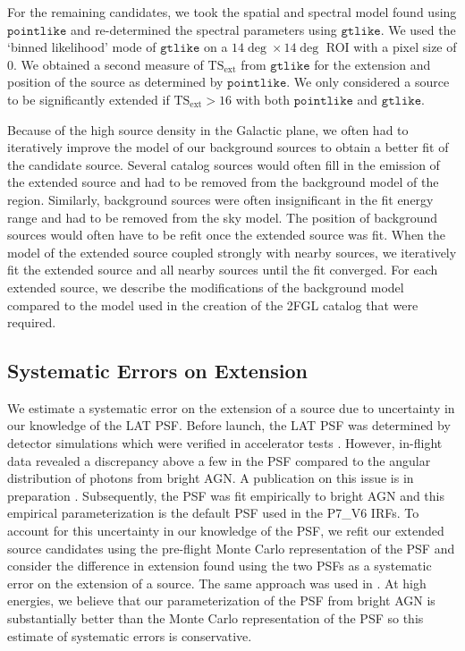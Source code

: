 \documentclass[12pt,preprint]{aastex}
\newcommand{\gev}{\text{GeV}\xspace}
\newcommand{\tsext}{{\ensuremath{\text{TS}_{\text{ext}}}}\xspace}
\newcommand{\gtlike}{\ensuremath{\mathtt{gtlike}}\xspace}
\newcommand{\pointlike}{\ensuremath{\mathtt{pointlike}}\xspace}
\begin{document}
For the remaining candidates, we took the spatial and spectral model found
using \pointlike and re-determined the spectral parameters using \gtlike.
We used the `binned likelihood' mode of \gtlike on a $14\deg\times14\deg$
ROI with a pixel size of 0.  We obtained a second measure of \tsext
from \gtlike for the extension and position of the source as determined
by \pointlike.  We only considered a source to be significantly extended
if $\tsext>16$ with both \pointlike and \gtlike.

Because of the high source density in the Galactic plane, we often had
to iteratively improve the model of our background sources to obtain a
better fit of the candidate source.  Several catalog sources would often
fill in the emission of the extended source and had to be removed from
the background model of the region.  Similarly, background sources were
often insignificant in the fit energy range and had to be removed from
the sky model.  The position of background sources would often have
to be refit once the extended source was fit.  When the model of the
extended source coupled strongly with nearby sources, we iteratively
fit the extended source and all nearby sources until the fit converged.
For each extended source, we describe the modifications of the background
model compared to the model used in the creation of the 2FGL catalog
that were required.

\subsection{Systematic Errors on Extension}
\label{systematic_errors_on_extension}


We estimate a systematic error on the extension of a source due to
uncertainty in our knowledge of the LAT PSF.  Before launch, the LAT
PSF was determined by detector simulations which were verified in
accelerator tests \citep{atwood_LAT_mission}. However, in-flight data
revealed a discrepancy above a few \gev in the PSF compared to the 
angular distribution of photons from bright AGN.  A publication on this issue is in
preparation \citep{lat_on_orbit_psf}.  Subsequently, the PSF was fit
empirically to bright AGN and this empirical parameterization is the
default PSF used in the P7\_V6 IRFs.  To account for this uncertainty in
our knowledge of the PSF, we refit our extended source candidates using
the pre-flight Monte Carlo representation of the PSF and consider the difference
in extension found using the two PSFs as a systematic error on the
extension of a source.  The same approach was used in \citep{ic443}.
At high energies, we believe that our parameterization of the PSF from
bright AGN is substantially better than the Monte Carlo representation
of the PSF so this estimate of systematic errors is conservative.
\end{document}
